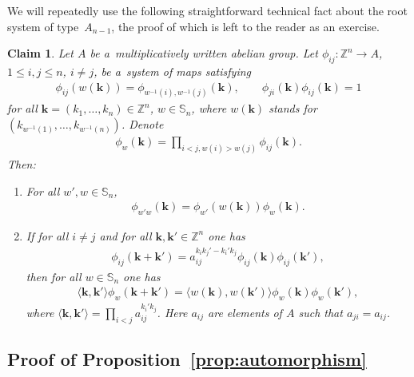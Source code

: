 \documentclass[11pt]{article}
\newtheorem{claim}[Theorem]{Claim}
\begin{document}
We will repeatedly use the following straightforward technical fact about the root system of type~$A_{n-1}$, the proof
of which is left to the reader as an exercise.
\begin{claim}
\label{claim:cocycle}
Let $A$ be a~multiplicatively written abelian group.
Let $\phi_{ij}\colon \mathbb Z^n\to A$, $1\le i,j\le n$, $i\ne j$, be a~system of maps satisfying
\begin{gather*}
\phi_{ij}(w(\mathbf k)) = \phi_{w^{-1}(i),w^{-1}(j)}(\mathbf k),
\qquad
\phi_{ji}(\mathbf k)\phi_{ij}(\mathbf k)=1
\end{gather*}
for all $\mathbf k=(k_1,\ldots,k_n)\in\mathbb Z^n$, $w\in\mathbb S_n$, where $w(\mathbf k)$ stands for
$(k_{w^{-1}(1)},\ldots,k_{w^{-1}(n)})$.
Denote
\begin{gather*}
\phi_w(\mathbf k) = \prod\limits_{i<j,w(i)>w(j)} \phi_{ij}(\mathbf k).
\end{gather*}
Then:
\begin{enumerate}\itemsep=0pt
\item[$(a)$] For all $w',w\in \mathbb S_n$,
\begin{gather*}
\phi_{w'w}(\mathbf k) = \phi_{w'}(w(\mathbf k))\phi_w(\mathbf k).
\end{gather*}

\item[$(b)$] If for all $i\ne j$ and for all $\mathbf k,\mathbf{k'}\in \mathbb Z^n$ one has
\begin{gather*}
\phi_{ij}(\mathbf k+\mathbf{k'}) = a_{ij}^{k_ik_j'- k_i'k_j} \phi_{ij}(\mathbf k)\phi_{ij}(\mathbf{k'}),
\end{gather*}
then for all $w\in \mathbb S_n$ one has
\begin{gather*}
\langle \mathbf k,\mathbf{k'}\rangle \phi_{w}(\mathbf k+\mathbf{k'}) = \langle w(\mathbf k),w(\mathbf{k'})\rangle
\phi_{w}(\mathbf k)\phi_{w}(\mathbf{k'}),
\end{gather*}
where $\langle \mathbf k,\mathbf{k'}\rangle= \prod\limits_{i<j}a_{ij}^{k_i'k_j}$.
Here $a_{ij}$ are elements of $A$ such that $a_{ji}=a_{ij}$.
\end{enumerate}
\end{claim}

\subsection*{Proof of Proposition~\ref{prop:automorphism}}
\end{document}
